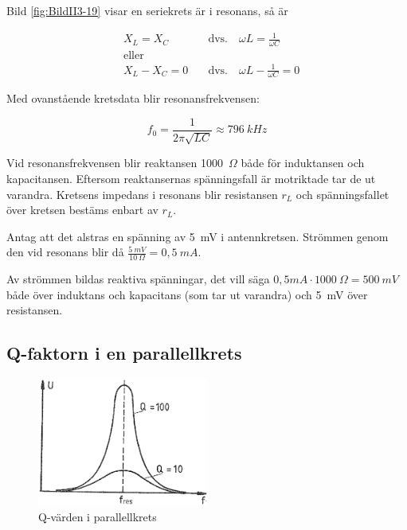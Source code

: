 Bild \ref{fig:BildII3-19} visar en seriekrets är i resonans, så är

\begin{align*}
& X_L = X_C \quad & \text{dvs.} \quad \omega L = \frac{1}{\omega C} \\
& \text{eller} & \\
& X_L - X_C = 0 \quad & \text{dvs.} \quad \omega L - \frac{1}{\omega C} = 0
\end{align*}

Med ovanstående kretsdata blir resonansfrekvensen:

\[
f_0 = \frac{1}{2\pi \sqrt{LC}} \approx 796\ kHz
\]

Vid resonansfrekvensen blir reaktansen 1000~\(\Omega\) både för induktansen och
kapacitansen.
Eftersom reaktansernas spänningsfall är motriktade tar de ut varandra.
Kretsens impedans i resonans blir resistansen \(r_L\) och
spänningsfallet över kretsen bestäms enbart av \(r_L\).

Antag att det alstras en spänning av 5~mV i antennkretsen.
Strömmen genom den vid resonans blir då \(\frac{5\ mV}{10\ \Omega} = 0,5\ mA\).

Av strömmen bildas reaktiva spänningar, det vill säga
\(0,5 mA \cdot 1000\ \Omega = 500\ mV\) både över induktans och kapacitans
(som tar ut varandra) och 5~mV över resistansen.

\subsection{Q-faktorn i en parallellkrets}
\label{Q-faktor}

\begin{figure}
\includegraphics[width=0.5\textwidth]{images/cropped_pdfs/bild_2_3-20.pdf}
\caption{Q-värden i parallellkrets}
\label{fig:BildII3-20}
\end{figure}

